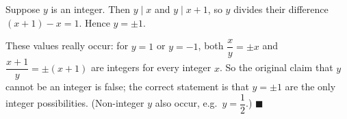 Suppose $y$ is an integer. Then $y\mid x$ and $y\mid x+1$, so $y$ divides their difference $(x+1)-x=1$. Hence $y=\pm1$.

These values really occur: for $y=1$ or $y=-1$, both $\dfrac {x}{y}=\pm x$ and $\dfrac{x+1}{y}=\pm(x+1)$ are integers for every integer $x$. So the original claim that $y$ cannot be an integer is false; the correct statement is that $\boxed{y=\pm1}$ are the only integer possibilities. (Non-integer $y$ also occur, e.g.\ $y=\dfrac{1}{2}$.) $\blacksquare$
